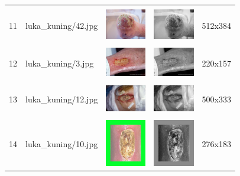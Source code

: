 \begin{table}[H]
\begin{tabular}{|m{0.2in}|m{1.2in}|m{0.7in}|m{0.7in}|m{0.7in}|}
		& &  &  &\\
		11& 
		luka\_kuning/42.jpg &
		\includegraphics[width=0.7in]{dataset/dataset_3/luka_kuning/ready/42.jpg}&
		\includegraphics[width=0.7in]{dataset/dataset_3/luka_kuning/ready/42_gray.jpg}&
		512x384\\
		\hline
		
		& &  &  &\\
		12& 
		luka\_kuning/3.jpg &
		\includegraphics[width=0.7in]{dataset/dataset_3/luka_kuning/ready/3.jpg}&
		\includegraphics[width=0.7in]{dataset/dataset_3/luka_kuning/ready/3_gray.jpg}&
		220x157\\
		\hline
		
		& &  &  &\\
		13& 
		luka\_kuning/12.jpg &
		\includegraphics[width=0.7in]{dataset/dataset_3/luka_kuning/ready/12.jpg}&
		\includegraphics[width=0.7in]{dataset/dataset_3/luka_kuning/ready/12_gray.jpg}&
		500x333\\
		\hline
		
		& &  &  &\\
		14& 
		luka\_kuning/10.jpg &
		\includegraphics[width=0.7in]{dataset/dataset_3/luka_kuning/ready/10.jpg}&
		\includegraphics[width=0.7in]{dataset/dataset_3/luka_kuning/ready/10_gray.jpg}&
		276x183\\
		\hline
	\end{tabular}
\end{table}

